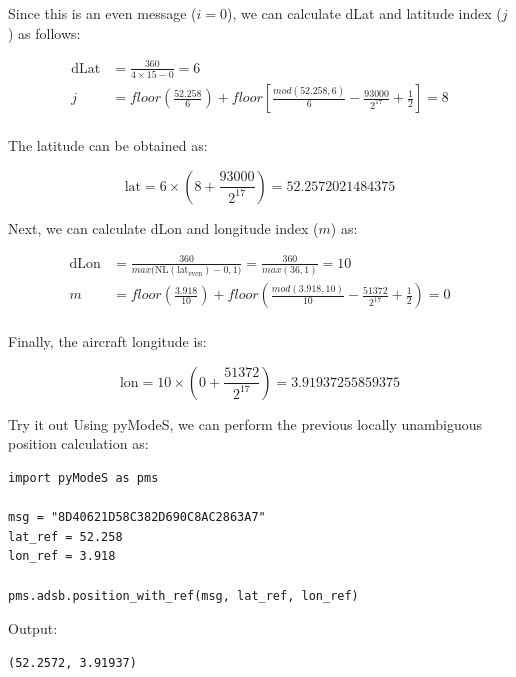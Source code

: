 Since this is an even message ($i=0$), we can calculate dLat and latitude index ($j$) as follows:

\begin{align}
  \mathrm{dLat} &= \frac{360}{4 \times 15 - 0} = 6 \\
  j &= floor \left( \frac{52.258}{6} \right) + floor \left[ \frac{mod(52.258, 6)}{6} - \frac{93000}{2^{17}}  + \frac{1}{2} \right] = 8 \\
\end{align}

The latitude can be obtained as:

\begin{equation}
  \mathrm{lat} = 6 \times \left( 8 + \frac{93000}{2^{17}} \right) = 52.2572021484375
\end{equation}

Next, we can calculate dLon and longitude index ($m$) as:

\begin{align}
  \mathrm{dLon} &= \frac{360}{max \Big( \mathrm{NL}(\mathrm{lat}_\mathrm{even})-0, 1 \Big)} = \frac{360}{max(36, 1)} = 10 \\
  m &= floor \left( \frac{3.918}{10} \right) + floor \left( \frac{mod(3.918, 10)}{10} - \frac{51372}{2^{17}}  + \frac{1}{2}  \right) = 0 \\
\end{align}


Finally, the aircraft longitude is:

\begin{equation}
  \mathrm{lon} = 10 \times \left(0 + \frac{51372}{2^{17}} \right) = 3.91937255859375
\end{equation}



\begin{notebox}{Try it out}
Using pyModeS, we can perform the previous locally unambiguous position calculation as: 

\begin{verbatim}
import pyModeS as pms

msg = "8D40621D58C382D690C8AC2863A7"
lat_ref = 52.258
lon_ref = 3.918

pms.adsb.position_with_ref(msg, lat_ref, lon_ref)
\end{verbatim}

Output: 

\begin{verbatim}
(52.2572, 3.91937)
\end{verbatim}

\end{notebox}


